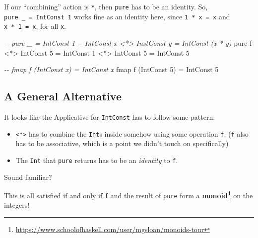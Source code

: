 \documentclass[]{article}
\newenvironment{Shaded}{}{}
\newcommand{\CommentTok}[1]{\textcolor[rgb]{0.38,0.63,0.69}{\textit{#1}}}
\newcommand{\DataTypeTok}[1]{\textcolor[rgb]{0.56,0.13,0.00}{#1}}
\newcommand{\DecValTok}[1]{\textcolor[rgb]{0.25,0.63,0.44}{#1}}
\newcommand{\FunctionTok}[1]{\textcolor[rgb]{0.02,0.16,0.49}{#1}}
\newcommand{\NormalTok}[1]{#1}
\newcommand{\OperatorTok}[1]{\textcolor[rgb]{0.40,0.40,0.40}{#1}}
\newcommand{\OtherTok}[1]{\textcolor[rgb]{0.00,0.44,0.13}{#1}}
\renewcommand{\href}[2]{#2\footnote{\url{#1}}}
\begin{document}
If our ``combining'' action is \texttt{*}, then \texttt{pure} has to be an
identity. So, \texttt{pure\ \_\ =\ IntConst\ 1} works fine as an identity here,
since \texttt{1\ *\ x\ =\ x} and \texttt{x\ *\ 1\ =\ x}, for all \texttt{x}.

\begin{Shaded}
\begin{Highlighting}[]
\CommentTok{{-}{-} pure \_                     = IntConst 1}
\CommentTok{{-}{-} IntConst x \textless{}*\textgreater{} InstConst y = IntConst (x * y)}
\FunctionTok{pure}\NormalTok{ f }\OperatorTok{\textless{}*\textgreater{}} \DataTypeTok{IntConst} \DecValTok{5} \OtherTok{=} \DataTypeTok{IntConst} \DecValTok{1} \OperatorTok{\textless{}*\textgreater{}} \DataTypeTok{IntConst} \DecValTok{5}
                      \OtherTok{=} \DataTypeTok{IntConst} \DecValTok{5}
\end{Highlighting}
\end{Shaded}

\begin{Shaded}
\begin{Highlighting}[]
\CommentTok{{-}{-} fmap f (IntConst x) = IntConst x}
\FunctionTok{fmap}\NormalTok{ f (}\DataTypeTok{IntConst} \DecValTok{5}\NormalTok{) }\OtherTok{=} \DataTypeTok{IntConst} \DecValTok{5}
\end{Highlighting}
\end{Shaded}

\subsection{A General Alternative}\label{a-general-alternative}

It looks like the Applicative for \texttt{IntConst} has to follow some pattern:

\begin{itemize}
\tightlist
\item
  \texttt{\textless{}*\textgreater{}} has to combine the \texttt{Int}s inside
  somehow using some operation \texttt{f}. (\texttt{f} also has to be
  associative, which is a point we didn't touch on specifically)
\item
  The \texttt{Int} that \texttt{pure} returns has to be an \emph{identity} to
  \texttt{f}.
\end{itemize}

Sound familiar?

This is all satisfied if and only if \texttt{f} and the result of \texttt{pure}
form a
\textbf{\href{https://www.schoolofhaskell.com/user/mgsloan/monoids-tour}{monoid}}
on the integers!
\end{document}
